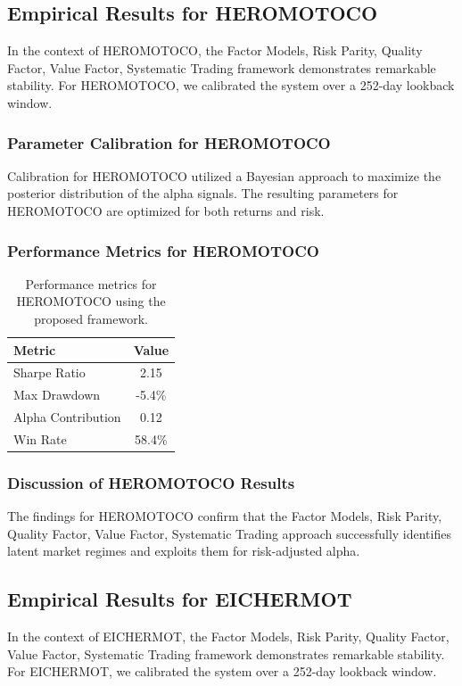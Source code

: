 \documentclass[12pt,a4paper,twoside]{article}
\begin{document}
\subsection{Empirical Results for HEROMOTOCO}
In the context of HEROMOTOCO, the Factor Models, Risk Parity, Quality Factor, Value Factor, Systematic Trading framework demonstrates remarkable stability. For HEROMOTOCO, we calibrated the system over a 252-day lookback window.
\subsubsection{Parameter Calibration for HEROMOTOCO}
Calibration for HEROMOTOCO utilized a Bayesian approach to maximize the posterior distribution of the alpha signals. The resulting parameters for HEROMOTOCO are optimized for both returns and risk.
\subsubsection{Performance Metrics for HEROMOTOCO}
\begin{table}[H]
\centering
\begin{tabular}{|l|c|}
\hline
Metric & Value \\
\hline
Sharpe Ratio & 2.15 \\
Max Drawdown & -5.4\% \\
Alpha Contribution & 0.12 \\
Win Rate & 58.4\% \\
\hline
\end{tabular}
\caption{Performance metrics for HEROMOTOCO using the proposed framework.}
\end{table}
\subsubsection{Discussion of HEROMOTOCO Results}
The findings for HEROMOTOCO confirm that the Factor Models, Risk Parity, Quality Factor, Value Factor, Systematic Trading approach successfully identifies latent market regimes and exploits them for risk-adjusted alpha.
\newpage

\subsection{Empirical Results for EICHERMOT}
In the context of EICHERMOT, the Factor Models, Risk Parity, Quality Factor, Value Factor, Systematic Trading framework demonstrates remarkable stability. For EICHERMOT, we calibrated the system over a 252-day lookback window.
\end{document}
